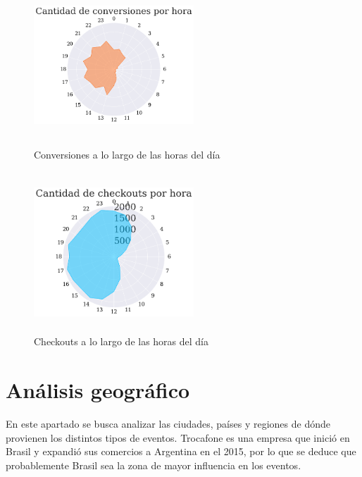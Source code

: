 \documentclass[a4paper]{article}
\begin{document}
\begin{figure}[h!]
	\includegraphics[width=6cm,height=6cm,keepaspectratio]{figures/040-hours-conversion-radarchart.png}
	\caption{Conversiones a lo largo de las horas del día}
	\label{conversionclock}
\end{figure}

\begin{figure}[h!]
	\includegraphics[width=6cm,height=6cm,keepaspectratio]{figures/041-hours-checkout-radarchart.png}
	\caption{Checkouts a lo largo de las horas del día}
	\label{checkoutclock}
\end{figure}

\section{Análisis geográfico}

En este apartado se busca analizar las ciudades, países y regiones de dónde provienen los distintos tipos de eventos. Trocafone es una empresa que inició en Brasil y expandió sus comercios a Argentina en el 2015, por lo que se deduce que probablemente Brasil sea la zona de mayor influencia en los eventos.
\end{document}
